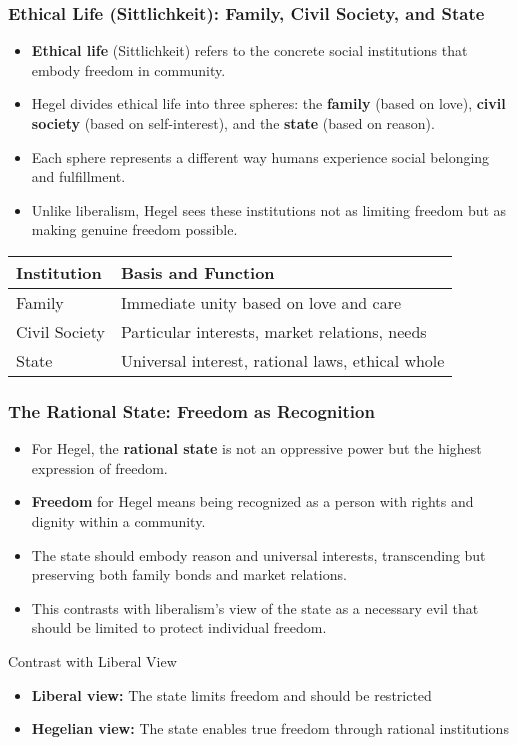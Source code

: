 \documentclass{beamer}
\begin{document}
\begin{frame}
\frametitle{Ethical Life (Sittlichkeit): Family, Civil Society, and State}
\begin{itemize}
    \item \textbf{Ethical life} (Sittlichkeit) refers to the concrete social institutions that embody freedom in community.
    \item Hegel divides ethical life into three spheres: the \textbf{family} (based on love), \textbf{civil society} (based on self-interest), and the \textbf{state} (based on reason).
    \item Each sphere represents a different way humans experience social belonging and fulfillment.
    \item Unlike liberalism, Hegel sees these institutions not as limiting freedom but as making genuine freedom possible.
\end{itemize}

\begin{center}
\begin{tabular}{p{3cm}p{7cm}}
\toprule
\textbf{Institution} & \textbf{Basis and Function} \\
\midrule
Family & Immediate unity based on love and care \\
Civil Society & Particular interests, market relations, needs \\
State & Universal interest, rational laws, ethical whole \\
\bottomrule
\end{tabular}
\end{center}
\end{frame}

\begin{frame}
\frametitle{The Rational State: Freedom as Recognition}
\begin{itemize}
    \item For Hegel, the \textbf{rational state} is not an oppressive power but the highest expression of freedom.
    \item \textbf{Freedom} for Hegel means being recognized as a person with rights and dignity within a community.
    \item The state should embody reason and universal interests, transcending but preserving both family bonds and market relations.
    \item This contrasts with liberalism's view of the state as a necessary evil that should be limited to protect individual freedom.
\end{itemize}

\begin{exampleblock}{Contrast with Liberal View}
\begin{itemize}
    \item \textbf{Liberal view:} The state limits freedom and should be restricted
    \item \textbf{Hegelian view:} The state enables true freedom through rational institutions
\end{itemize}
\end{exampleblock}
\end{frame}
\end{document}
